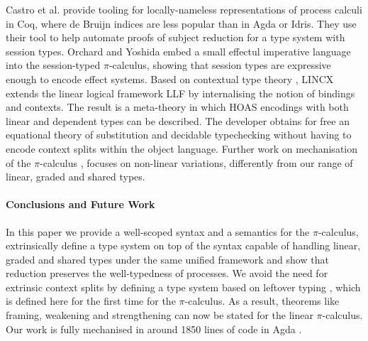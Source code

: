 \documentclass[runningheads]{llncs}
\newcommand{\picalc}{$\pi$-calculus}
\begin{document}
Castro et al. \cite{Castro2020} provide tooling for locally-nameless representations of process calculi in Coq, where de Bruijn indices are less popular than in Agda or Idris.
They use their tool to help automate proofs of subject reduction for a type system with session types.
%
Orchard and Yoshida \cite{OrchardY16} embed a small effectul imperative language into the session-typed \picalc{}, showing that session types are expressive enough to encode effect systems.
%
Based on contextual type theory \cite{Pientkaa,Pientka}, LINCX \cite{Georges2017} extends the linear logical framework LLF \cite{Cervesato1996} by internalising the notion of bindings and contexts.
The result is a meta-theory in which HOAS encodings with both linear and dependent types can be described.
The developer obtains for free an equational theory of substitution and decidable typechecking without having to encode context splits within the object language.
%
Further work on mechanisation of the \picalc{} \cite{Henry-Gerard1999,Honsell2001a,Bengtson2013,Despeyroux2000,Affeldt2008}, focuses on non-linear variations, differently from our range of linear, graded and shared types.

\paragraph*{Conclusions and Future Work}

In this paper we provide a well-scoped syntax and a semantics for the \picalc{}, extrinsically define a type system on top of the syntax capable of handling linear, graded and shared types under the same unified framework and show that reduction preserves the well-typedness of processes.
We avoid the need for extrinsic context splits by defining a type system based on leftover typing \cite{Allais2018a}, which is defined here for the first time for the \picalc{}.
As a result, theorems like framing, weakening and strengthening can now be stated for the linear \picalc{}.
Our work is fully mechanised in around 1850 lines of code in Agda \cite{Zalakain2020Agda}.
\end{document}
